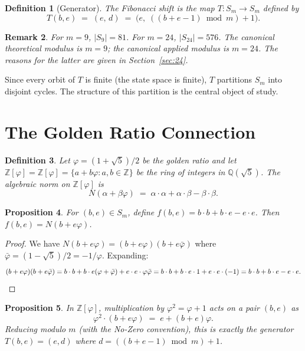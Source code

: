 \documentclass[11pt]{article}
\newtheorem{definition}{Definition}[section]
\newtheorem{proposition}[definition]{Proposition}
\newtheorem{remark}[definition]{Remark}
\newcommand{\Zphi}{\mathbb{Z}[\varphi]}
\begin{document}
\begin{definition}[Generator]
The \emph{Fibonacci shift} is the map $T \colon S_m \to S_m$ defined by
\[
  T(b,e) \;=\; (e,\, d) \;=\; \bigl(e,\; ((b+e-1) \bmod m) + 1\bigr).
\]
\end{definition}

\begin{remark}
For $m=9$, $|S_9| = 81$.  For $m=24$, $|S_{24}| = 576$.  The canonical theoretical modulus is $m=9$; the canonical applied modulus is $m=24$.  The reasons for the latter are given in Section~\ref{sec:24}.
\end{remark}

Since every orbit of $T$ is finite (the state space is finite), $T$ partitions $S_m$ into disjoint cycles.  The structure of this partition is the central object of study.

\section{The Golden Ratio Connection}\label{sec:golden}

\begin{definition}
Let $\varphi = (1+\sqrt{5})/2$ be the golden ratio and let $\Zphi = \mathbb{Z}[\varphi] = \{a + b\varphi : a,b \in \mathbb{Z}\}$ be the ring of integers in $\mathbb{Q}(\sqrt{5})$.  The \emph{algebraic norm} on $\Zphi$ is
\[
  N(\alpha + \beta\varphi) \;=\; \alpha\cdot\alpha + \alpha\cdot\beta - \beta\cdot\beta.
\]
\end{definition}

\begin{proposition}\label{prop:norm}
For $(b,e) \in S_m$, define $f(b,e) = b\cdot b + b\cdot e - e\cdot e$.  Then $f(b,e) = N(b + e\varphi)$.
\end{proposition}

\begin{proof}
We have $N(b + e\varphi) = (b+e\varphi)(b+e\bar\varphi)$ where $\bar\varphi = (1-\sqrt{5})/2 = -1/\varphi$.  Expanding:
\[
  (b+e\varphi)(b+e\bar\varphi) = b\cdot b + b\cdot e(\varphi + \bar\varphi) + e\cdot e \cdot \varphi\bar\varphi = b\cdot b + b\cdot e\cdot 1 + e\cdot e\cdot(-1) = b\cdot b + b\cdot e - e\cdot e. \qedhere
\]
\end{proof}

\begin{proposition}\label{prop:phi2}
In $\Zphi$, multiplication by $\varphi^2 = \varphi + 1$ acts on a pair $(b,e)$ as
\[
  \varphi^2 \cdot (b + e\varphi) \;=\; e + (b+e)\varphi.
\]
Reducing modulo $m$ (with the No-Zero convention), this is exactly the generator $T(b,e) = (e, d)$ where $d = ((b+e-1)\bmod m)+1$.
\end{proposition}
\end{document}
